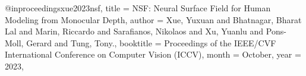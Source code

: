 @inproceedings{xue2023nsf,
  title     = {{NSF: Neural Surface Field for Human Modeling from Monocular Depth}},
  author    = {Xue, Yuxuan and Bhatnagar, Bharat Lal and Marin, Riccardo and Sarafianos, Nikolaos and Xu, Yuanlu and Pons-Moll, Gerard and Tung, Tony.},
  booktitle = {Proceedings of the IEEE/CVF International Conference on Computer Vision (ICCV)},
  month     = {October},
  year      = {2023},
}
